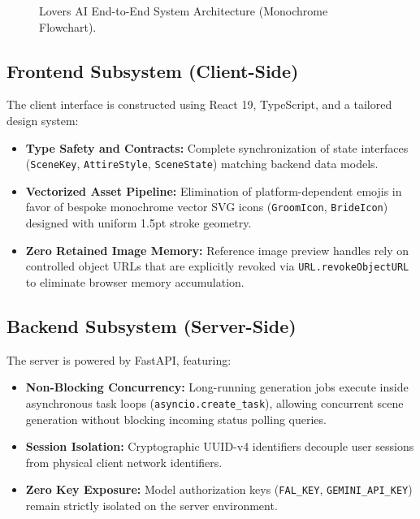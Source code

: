 \documentclass[11pt,a4paper]{article}
\begin{document}
\begin{figure}[htbp]
\caption{Lovers AI End-to-End System Architecture (Monochrome Flowchart).}
\label{fig:architecture}
\end{figure}

\subsection{Frontend Subsystem (Client-Side)}
The client interface is constructed using React 19, TypeScript, and a tailored design system:
\begin{itemize}[leftmargin=*]
    \item \textbf{Type Safety and Contracts:} Complete synchronization of state interfaces (\texttt{SceneKey}, \texttt{AttireStyle}, \texttt{SceneState}) matching backend data models.
    \item \textbf{Vectorized Asset Pipeline:} Elimination of platform-dependent emojis in favor of bespoke monochrome vector SVG icons (\texttt{GroomIcon}, \texttt{BrideIcon}) designed with uniform 1.5pt stroke geometry.
    \item \textbf{Zero Retained Image Memory:} Reference image preview handles rely on controlled object URLs that are explicitly revoked via \texttt{URL.revokeObjectURL} to eliminate browser memory accumulation.
\end{itemize}

\subsection{Backend Subsystem (Server-Side)}
The server is powered by FastAPI, featuring:
\begin{itemize}[leftmargin=*]
    \item \textbf{Non-Blocking Concurrency:} Long-running generation jobs execute inside asynchronous task loops (\texttt{asyncio.create\_task}), allowing concurrent scene generation without blocking incoming status polling queries.
    \item \textbf{Session Isolation:} Cryptographic UUID-v4 identifiers decouple user sessions from physical client network identifiers.
    \item \textbf{Zero Key Exposure:} Model authorization keys (\texttt{FAL\_KEY}, \texttt{GEMINI\_API\_KEY}) remain strictly isolated on the server environment.
\end{itemize}
\end{document}
